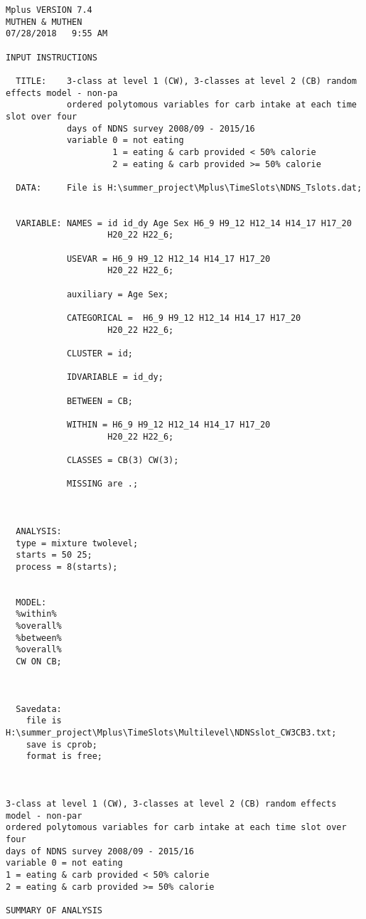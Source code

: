 \documentclass[]{article}
\begin{document}
\begin{verbatim}
Mplus VERSION 7.4
MUTHEN & MUTHEN
07/28/2018   9:55 AM

INPUT INSTRUCTIONS

  TITLE:    3-class at level 1 (CW), 3-classes at level 2 (CB) random effects model - non-pa
            ordered polytomous variables for carb intake at each time slot over four
            days of NDNS survey 2008/09 - 2015/16
            variable 0 = not eating
                     1 = eating & carb provided < 50% calorie
                     2 = eating & carb provided >= 50% calorie

  DATA:     File is H:\summer_project\Mplus\TimeSlots\NDNS_Tslots.dat;


  VARIABLE: NAMES = id id_dy Age Sex H6_9 H9_12 H12_14 H14_17 H17_20
                    H20_22 H22_6;

            USEVAR = H6_9 H9_12 H12_14 H14_17 H17_20
                    H20_22 H22_6;

            auxiliary = Age Sex;

            CATEGORICAL =  H6_9 H9_12 H12_14 H14_17 H17_20
                    H20_22 H22_6;

            CLUSTER = id;

            IDVARIABLE = id_dy;

            BETWEEN = CB;

            WITHIN = H6_9 H9_12 H12_14 H14_17 H17_20
                    H20_22 H22_6;

            CLASSES = CB(3) CW(3);

            MISSING are .;



  ANALYSIS:
  type = mixture twolevel;
  starts = 50 25;
  process = 8(starts);


  MODEL:
  %within%
  %overall%
  %between%
  %overall%
  CW ON CB;



  Savedata:
    file is H:\summer_project\Mplus\TimeSlots\Multilevel\NDNSslot_CW3CB3.txt;
    save is cprob;
    format is free;



3-class at level 1 (CW), 3-classes at level 2 (CB) random effects model - non-par
ordered polytomous variables for carb intake at each time slot over four
days of NDNS survey 2008/09 - 2015/16
variable 0 = not eating
1 = eating & carb provided < 50% calorie
2 = eating & carb provided >= 50% calorie

SUMMARY OF ANALYSIS


\end{verbatim}
\end{document}

